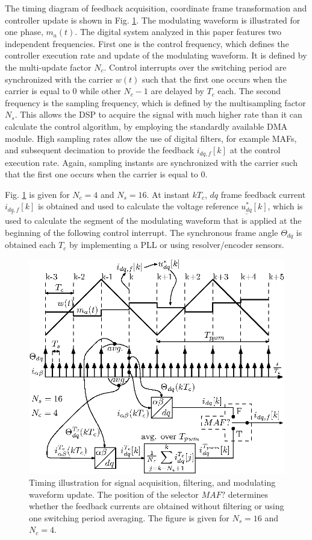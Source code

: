 \documentclass[conference]{IEEEtran}
\begin{document}
The timing diagram of feedback acquisition, coordinate frame transformation and controller update is shown in Fig. \ref{fig:timings}. The modulating waveform is illustrated for one phase, $m_a(t)$.
The digital system analyzed in this paper features two independent frequencies. First one is the control frequency, which defines the controller execution rate and update of the modulating waveform. It is defined by the multi-update factor $N_c$. Control interrupts over the switching period are synchronized with the carrier $w(t)$ such that the first one occurs when the carrier is equal to $0$ while other $N_c-1$ are delayed by $T_c$ each. 
The second frequency is the sampling frequency, which is defined by the multisampling factor $N_s$. This allows the DSP to acquire the signal with much higher rate than it can calculate the control algorithm, by employing the standardly available DMA module. High sampling rates allow the use of digital filters, for example MAFs, and subsequent decimation to provide the feedback $i_{dq,f}[k]$ at the control execution rate.
Again, sampling instants are synchronized with the carrier such that the first one occurs when the carrier is equal to $0$. 

Fig. \ref{fig:timings} is given for $N_c = 4$ and $N_s = 16$. At instant $kT_c$, $dq$ frame feedback current $\underline{i_{dq,f}}[k]$ is obtained and used to calculate the voltage reference $\underline{u^*_{dq}}[k]$, which is used to calculate the segment of the modulating waveform that is applied at the beginning of the following control interrupt. The synchronous frame angle $\Theta_{dq}$ is obtained each $T_c$ by implementing a PLL or using resolver/encoder sensors. 

\begin{figure}[t!]
    \centerline{\includegraphics[width=0.95\linewidth]{figures/timing_diagram.eps}}
    \caption{Timing illustration for signal acquisition, filtering, and modulating waveform update. The position of the selector $MAF?$ determines whether the feedback currents are obtained without filtering or using one switching period averaging. The figure is given for $N_s = 16$ and $N_c = 4$.}
    \label{fig:timings}
\end{figure}
\end{document}
